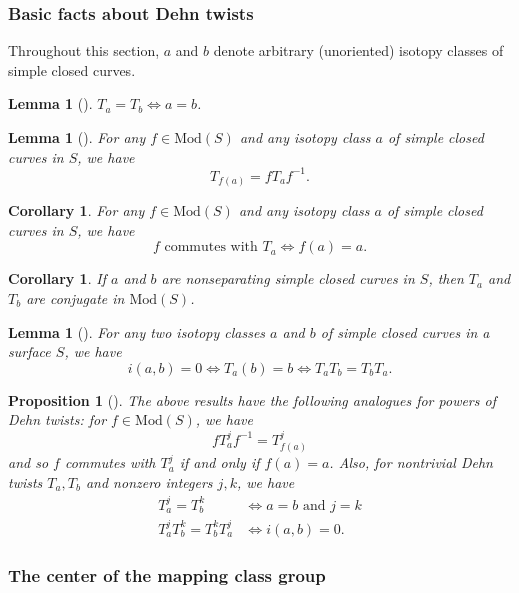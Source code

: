 \documentclass[reqno]{amsart}
\newtheorem{lemma}[theorem]{Lemma}
\newtheorem{proposition}[theorem]{Proposition}
\newtheorem{corollary}[theorem]{Corollary}
\theoremstyle{definition}
\theoremstyle{remark}
\newcommand{\Mod}{{\mathrm{Mod}}}
\begin{document}
\subsubsection{Basic facts about Dehn twists}

Throughout this section, $a$ and $b$ denote arbitrary
(unoriented) isotopy classes of simple closed curves.

\begin{lemma}[]
    $T_a = T_b \iff a = b$.
\end{lemma}

\begin{lemma}[]
    For any $f \in \Mod(S)$ and any isotopy class $a$ of
    simple closed curves in $S$, we have
    \[
    T_{f(a)} = f T_a f^{-1}.
    \] 
\end{lemma}


\begin{corollary}
    For any $f \in \Mod(S)$ and any isotopy class $a$ of simple
    closed curves in $S$, we have
    \[
    f \text{ commutes with }T_a \iff
    f(a) = a.
    \] 
\end{corollary}

\begin{corollary}
    If $a$ and $b$ are nonseparating simple closed curves
    in $S$, then $T_a$ and $T_b$ are conjugate in
    $\Mod(S)$.
\end{corollary}

\begin{lemma}[]
    For any two isotopy classes $a$ and $b$ of simple
    closed curves in a surface $S$, we have
    \[
    i(a,b) = 0 \iff T_a(b) = b \iff
    T_a T_b = T_b T_a.
    \] 
\end{lemma}

\begin{proposition}[]
    The above results have the following analogues for
    powers of Dehn twists:
    for $f \in \Mod(S)$, we have
    \[
    f T_a^{j} f^{-1} = T_{f(a)}^{j}
    \] 
    and so $f$ commutes with $T_a^{j}$ if and only if
    $f(a) = a$. Also, for nontrivial Dehn
    twists $T_a, T_b$ and nonzero integers $j,k$, we have
    \begin{align*}
        T_a^{j} = T_b^{k} &\iff a=b \text{ and } j=k\\
        T_a^{j} T_b^{k} = T_b^{k} T_a^{j} &\iff i(a,b) =0.
    \end{align*}
\end{proposition}

\subsubsection{The center of the mapping class group}
\end{document}
